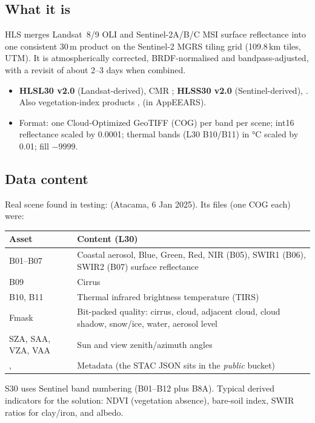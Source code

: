\documentclass[10pt,a4paper]{article}
\begin{document}
\subsection{What it is}
HLS merges Landsat~8/9 OLI and Sentinel-2A/B/C MSI surface reflectance into one consistent 30\,m product on the Sentinel-2 MGRS tiling grid (109.8\,km tiles, UTM). It is atmospherically corrected, BRDF-normalised and bandpass-adjusted, with a revisit of about 2--3 days when combined.
\begin{itemize}
\item \textbf{HLSL30 v2.0} (Landsat-derived), CMR ; \textbf{HLSS30 v2.0} (Sentinel-derived), . Also vegetation-index products ,  (in AppEEARS).
\item Format: one Cloud-Optimized GeoTIFF (COG) per band per scene; int16 reflectance scaled by 0.0001; thermal bands (L30 B10/B11) in °C scaled by 0.01; fill $-9999$.
\end{itemize}

\subsection{Data content}
Real scene found in testing:  (Atacama, 6 Jan 2025). Its files (one COG each) were:
{\small{}
\begin{tabularx}{\textwidth}{@{}>{\raggedright\arraybackslash}p{2.6cm}L@{}}
\toprule\textbf{Asset} & \textbf{Content (L30)}\\\midrule
B01--B07 & Coastal aerosol, Blue, Green, Red, NIR (B05), SWIR1 (B06), SWIR2 (B07) surface reflectance\\
B09 & Cirrus\\
B10, B11 & Thermal infrared brightness temperature (TIRS)\\
Fmask & Bit-packed quality: cirrus, cloud, adjacent cloud, cloud shadow, snow/ice, water, aerosol level\\
SZA, SAA, VZA, VAA & Sun and view zenith/azimuth angles\\
,  & Metadata (the STAC JSON sits in the \emph{public} bucket)\\
\bottomrule
\end{tabularx}}

S30 uses Sentinel band numbering (B01--B12 plus B8A). Typical derived indicators for the solution: NDVI (vegetation absence), bare-soil index, SWIR ratios for clay/iron, and albedo.
\end{document}
